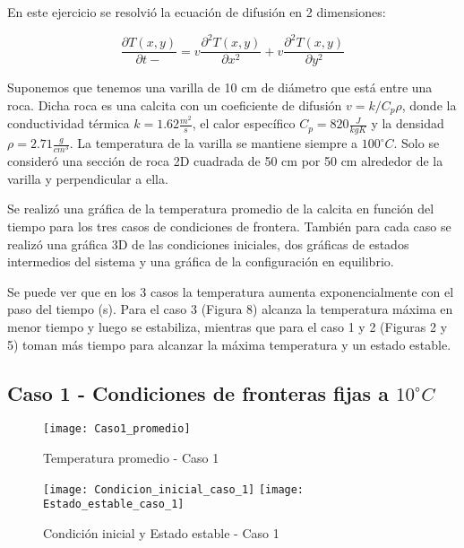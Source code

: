 \documentclass{article}
\begin{document}
En este ejercicio se resolvió la ecuación de difusión en 2 dimensiones:

\begin{equation}
    \frac{\partial T (x,y)}{\partial t-} = v \frac{\partial^2 T(x,y)}{\partial x^2} + v \frac{\partial^2 T (x,y)}{\partial y^2}
\end{equation}

\vspace{3mm}

Suponemos que tenemos una varilla de 10 cm de diámetro que está entre una roca. Dicha roca es una calcita con un coeficiente de difusión $v = k/C_{p}\rho$, donde la conductividad térmica $k = 1.62 \frac{m^2}{s}$, el calor específico $C_{p} = 820 \frac{J}{kg K}$ y la densidad $\rho = 2.71 \frac{g}{cm^3}$. La temperatura de la varilla se mantiene siempre a $100^\circ C$. Solo se consideró una sección de roca 2D cuadrada de 50 cm por 50 cm alrededor de la varilla y perpendicular a ella.

\vspace{3mm}

Se realizó una gráfica de la temperatura promedio de la calcita en función del tiempo para los tres casos de condiciones de frontera. También para cada caso se realizó una gráfica 3D de las condiciones iniciales, dos gráficas de estados intermedios del sistema y una gráfica de la configuración en equilibrio.

\vspace{3mm}
Se puede ver que en los 3 casos la temperatura aumenta exponencialmente con el paso del tiempo (s). Para el caso 3 (Figura 8) alcanza la temperatura máxima en menor tiempo y luego se estabiliza, mientras que para el caso 1 y 2 (Figuras 2 y 5) toman más tiempo para alcanzar la máxima temperatura y un estado estable.

\newpage

\subsection{Caso 1 - Condiciones de fronteras fijas a $10^\circ C$}


\begin{figure}[h!]
\centering
\texttt{[image: Caso1\_promedio]}
\caption{Temperatura promedio - Caso 1}
\label{temp1}
\end{figure}


\begin{figure}[h!]
\centering
\texttt{[image: Condicion\_inicial\_caso\_1]}
\texttt{[image: Estado\_estable\_caso\_1]}
\caption{Condición inicial y Estado estable - Caso 1}
\label{cond1}
\end{figure}
\end{document}

